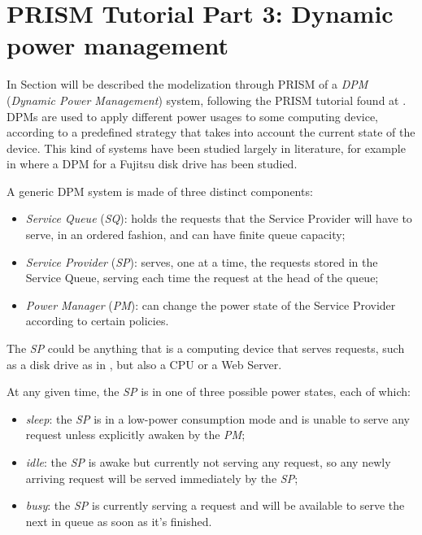 
\section*{PRISM Tutorial Part 3: Dynamic power management}

  In Section will be described the modelization through PRISM of a \textit{DPM} (\textit{Dynamic Power Management}) system, following the PRISM tutorial found at \cite{prism-tutorial3}. DPMs are used to apply different power usages to some computing device, according to a predefined strategy that takes into account the current state of the device. This kind of systems have been studied largely in literature, for example in \cite{qiu2001stochastic} where a DPM for a Fujitsu disk drive has been studied.
  
  A generic DPM system is made of three distinct components:
  
  \begin{itemize}
    \item \textit{Service Queue} (\textit{SQ}): holds the requests that the Service Provider will have to serve, in an ordered fashion, and can have finite queue capacity;
    \item \textit{Service Provider} (\textit{SP}): serves, one at a time, the requests stored in the Service Queue, serving each time the request at the head of the queue;
    \item \textit{Power Manager} (\textit{PM}): can change the power state of the Service Provider according to certain policies.
  \end{itemize}
  
  The \textit{SP} could be anything that is a computing device that serves requests, such as a disk drive as in \cite{qiu2001stochastic}, but also a CPU or a Web Server.
  
  At any given time, the \textit{SP} is in one of three possible power states, each of which:
  
  \begin{itemize}
    \item \textit{sleep}: the \textit{SP} is in a low-power consumption mode and is unable to serve any request unless explicitly awaken by the \textit{PM};
    \item \textit{idle}: the \textit{SP} is awake but currently not serving any request, so any newly arriving request will be served immediately by the \textit{SP};
    \item \textit{busy}: the \textit{SP} is currently serving a request and will be available to serve the next in queue as soon as it's finished.
  \end{itemize}
  
